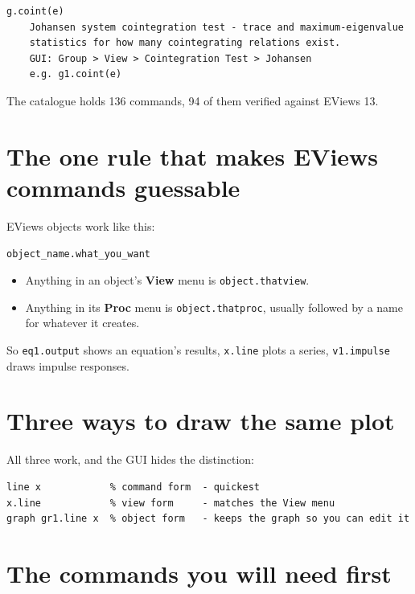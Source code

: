 \documentclass[11pt,a4paper]{report}
\begin{document}
\begin{lstlisting}
g.coint(e)
    Johansen system cointegration test - trace and maximum-eigenvalue
    statistics for how many cointegrating relations exist.
    GUI: Group > View > Cointegration Test > Johansen
    e.g. g1.coint(e)
\end{lstlisting}

The catalogue holds 136 commands, 94 of them verified against EViews 13.

\section{The one rule that makes EViews commands guessable}

EViews objects work like this:

\begin{center}
\texttt{object\_name.what\_you\_want}
\end{center}

\begin{itemize}
  \item Anything in an object's \textbf{View} menu is \texttt{object.thatview}.
  \item Anything in its \textbf{Proc} menu is \texttt{object.thatproc}, usually
        followed by a name for whatever it creates.
\end{itemize}

So \texttt{eq1.output} shows an equation's results, \texttt{x.line} plots a
series, \texttt{v1.impulse} draws impulse responses.

\section{Three ways to draw the same plot}

All three work, and the GUI hides the distinction:

\begin{lstlisting}
line x            % command form  - quickest
x.line            % view form     - matches the View menu
graph gr1.line x  % object form   - keeps the graph so you can edit it
\end{lstlisting}

\section{The commands you will need first}
\end{document}
